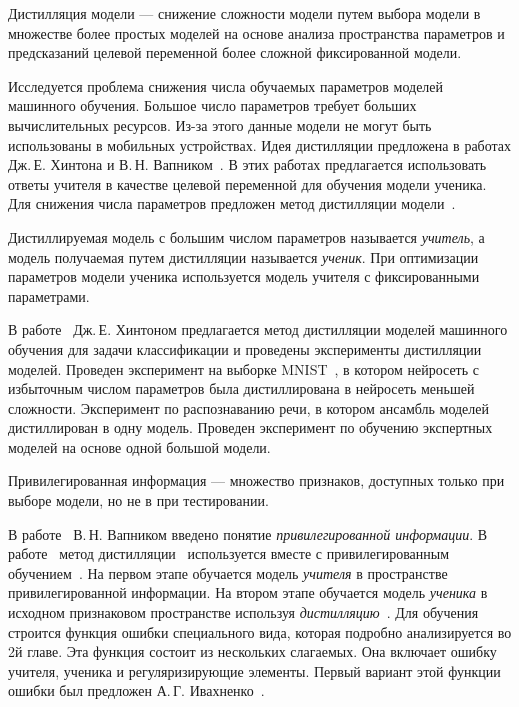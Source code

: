 \begin{definition}
Дистилляция модели --- снижение сложности модели путем выбора модели в множестве более простых моделей на основе анализа пространства параметров и предсказаний целевой переменной более сложной фиксированной модели.
\end{definition}

Исследуется проблема снижения числа обучаемых параметров моделей машинного обучения.
Большое число параметров требует больших вычислительных ресурсов.
Из-за этого данные модели не могут быть использованы в мобильных устройствах.
Идея дистилляции предложена в работах Дж.\,Е. Хинтона и В.\,Н. Вапником~\cite{Hinton2015, Vapnik2015, Lopez2016}. В этих работах предлагается использовать ответы учителя в качестве целевой переменной для обучения модели ученика.
Для снижения числа параметров предложен метод дистилляции модели~\cite{Hinton2015, Vapnik2015, Lopez2016}.

Дистиллируемая модель с большим числом параметров называется \textit{учитель}, а модель получаемая путем дистилляции называется \textit{ученик}.
При оптимизации параметров модели ученика используется модель учителя с фиксированными параметрами.

В работе~\cite{Hinton2015} Дж.\,Е. Хинтоном предлагается метод дистилляции моделей машинного обучения для задачи классификации и проведены эксперименты дистилляции моделей. Проведен эксперимент на выборке MNIST~\cite{mnist}, в котором нейросеть с избыточным числом параметров была дистиллирована в нейросеть меньшей сложности. Эксперимент по распознаванию речи, в котором ансамбль моделей дистиллирован в одну модель. Проведен эксперимент по обучению экспертных моделей на основе одной большой модели.

\begin{definition}
Привилегированная информация --- множество признаков, доступных только при выборе модели, но не в при тестировании.
\end{definition}

В работе~\cite{Vapnik2015} В.\,Н. Вапником введено понятие \textit{привилегированной информации}. В работе~\cite{Lopez2016} метод дистилляции~\cite{Hinton2015} используется вместе с привилегированным обучением~\cite{Vapnik2015}. На первом этапе обучается модель \textit{учителя} в пространстве привилегированной информации. На втором этапе обучается модель \textit{ученика} в исходном признаковом пространстве используя \textit{дистилляцию}~\cite{Hinton2015}. Для обучения строится функция ошибки специального вида, которая подробно анализируется во 2й главе. Эта функция состоит из нескольких слагаемых. Она включает ошибку учителя, ученика и регуляризирующие элементы.  Первый вариант этой функции ошибки был предложен А.\,Г. Ивахненко~\cite{Ivakhnenko1994}.

